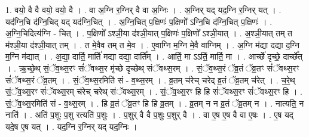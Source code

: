\documentclass[17pt]{extarticle}
\begin{document}
1. वयो॒ वै वै वयो॒ वयो॒ वै । . वा अ॒ग्नि र॒ग्निर् वै वा अ॒ग्निः । . अ॒ग्निर् यद् यद॒ग्नि र॒ग्निर् यत् । . यद॑ग्नि॒चि द॑ग्नि॒चिद् यद् यद॑ग्नि॒चित् । . अ॒ग्नि॒चित् प॒क्षिणः॑ प॒क्षिणो᳚ ऽग्नि॒चि द॑ग्नि॒चित् प॒क्षिणः॑ । . अ॒ग्नि॒चिदित्य॑ग्नि - चित् । . प॒क्षिणो᳚ ऽश्ञी॒या द॑श्ञी॒यात् प॒क्षिणः॑ प॒क्षिणो᳚ ऽश्ञी॒यात् । . अ॒श्ञी॒यात् तम् त म॑श्ञी॒या द॑श्ञी॒यात् तम् । . त मे॒वैव तम् त मे॒व । . ए॒वाग्नि म॒ग्नि मे॒वै वाग्निम् । . अ॒ग्नि म॑द्या दद्या द॒ग्नि म॒ग्नि म॑द्यात् । . अ॒द्या॒ दार्ति॒ मार्ति॑ मद्या दद्या॒ दार्ति᳚म् । . आर्ति॒ मा ऽऽर्ति॒ मार्ति॒ मा । . आर्च्छे॑ दृच्छे॒ दार्च्छे᳚त् । . ऋ॒च्छे॒थ् सं॒ॅव॒थ्स॒रꣳ सं॑ॅवथ्स॒र मृ॑च्छे दृच्छेथ् संॅवथ्स॒रम् । . सं॒ॅव॒थ्स॒रं ॅव्र॒तं ॅव्र॒तꣳ सं॑ॅवथ्स॒रꣳ सं॑ॅवथ्स॒रं ॅव्र॒तम् । . सं॒ॅव॒थ्स॒रमिति॑ सं - व॒थ्स॒रम् । . व्र॒तम् च॑रेच् चरेद् व्र॒तं ॅव्र॒तम् च॑रेत् । . च॒रे॒थ् सं॒ॅव॒थ्स॒रꣳ सं॑ॅवथ्स॒रम् च॑रेच् चरेथ् संॅवथ्स॒रम् । . सं॒ॅव॒थ्स॒रꣳ हि हि सं॑ॅवथ्स॒रꣳ सं॑ॅवथ्स॒रꣳ हि । . सं॒ॅव॒थ्स॒रमिति॑ सं - व॒थ्स॒रम् । . हि व्र॒तं ॅव्र॒तꣳ हि हि व्र॒तम् । . व्र॒तम् न न व्र॒तं ॅव्र॒तम् न । . नात्यति॒ न नाति॑ । . अति॑ प॒शुः प॒शु रत्यति॑ प॒शुः । . प॒शुर् वै वै प॒शुः प॒शुर् वै । . वा ए॒ष ए॒ष वै वा ए॒षः । . ए॒ष यद् यदे॒ष ए॒ष यत् । . यद॒ग्नि र॒ग्निर् यद् यद॒ग्निः । \newline
\end{document}
